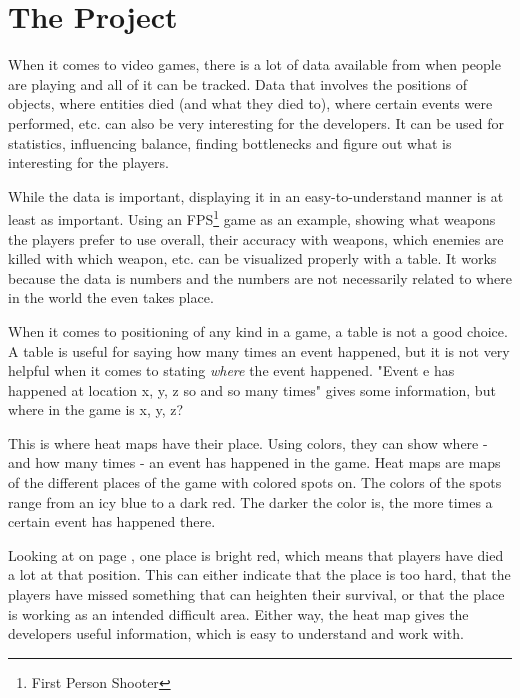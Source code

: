 \section{The Project}
\label{02}

When it comes to video games, there is a lot of data available from when people are playing and all of it can be tracked. Data that involves the positions of objects, where entities died (and what they died to), where certain events were performed, etc. can also be very interesting for the developers. It can be used for statistics, influencing balance, finding bottlenecks and figure out what is interesting for the players.

While the data is important, displaying it in an easy-to-understand manner is at least as important. Using an FPS\footnote{First Person Shooter} game as an example, showing what weapons the players prefer to use overall, their accuracy with weapons, which enemies are killed with which weapon, etc. can be visualized properly with a table. It works because the data is numbers and the numbers are not necessarily related to where in the world the even takes place.

When it comes to positioning of any kind in a game, a table is not a good choice. A table is useful for saying how many times an event happened, but it is not very helpful when it comes to stating \textit{where} the event happened. "Event e has happened at location x, y, z so and so many times" gives some information, but where in the game is x, y, z?


This is where heat maps have their place. Using colors, they can show where - and how many times - an event has happened in the game. Heat maps are maps of the different places of the game with colored spots on. The colors of the spots range from an icy blue to a dark red. The darker the color is, the more times a certain event has happened there.

Looking at  on page \pageref{fig:HL_2_HeatMap}, one place is bright red, which means that players have died a lot at that position. This can either indicate that the place is too hard, that the players have missed something that can heighten their survival, or that the place is working as an intended difficult area. Either way, the heat map gives the developers useful information, which is easy to understand and work with.

